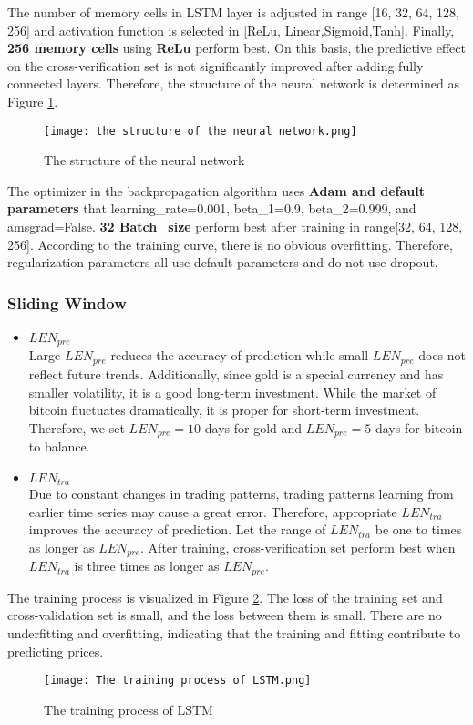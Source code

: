 \documentclass[12pt]{article}
\begin{document}
The number of memory cells in LSTM layer is adjusted in range [16, 32, 64, 128, 256] and activation function is selected in [ReLu, Linear,Sigmoid,Tanh]. Finally, \textbf{256 memory cells} using \textbf{ReLu} perform best. On this basis, the predictive effect on the cross-verification set is not significantly improved after adding fully connected layers. Therefore, the structure of the neural network is determined as Figure \ref{F5}.
\begin{figure}[htb]
\centering
\texttt{[image: the structure of the neural network.png]}
\caption{The structure of the neural network}
\label{F5} %
\end{figure}
The optimizer in the backpropagation algorithm uses \textbf{Adam and default parameters} that learning\_rate=0.001, beta\_1=0.9, beta\_2=0.999, and amsgrad=False. \textbf{32 Batch\_size} perform best after training in range[32, 64, 128, 256]. According to the training curve, there is no obvious overfitting. Therefore, regularization parameters all use default parameters and do not use dropout.

\subsubsection{Sliding Window}
\begin{itemize}
\item \textbf{$LEN_{pre}$}\\
Large $LEN_{pre}$ reduces the accuracy of prediction while small $LEN_{pre}$ does not reflect future trends. Additionally, since gold is a special currency and has smaller volatility, it is a good long-term investment. While the market of bitcoin fluctuates dramatically, it is proper for short-term investment. Therefore, we set $LEN_{pre}=10$ days for gold and $LEN_{pre}=5$ days for bitcoin to balance. 
\item \textbf{$LEN_{tra}$}\\
Due to constant changes in trading patterns, trading patterns learning from earlier time series may cause a great error. Therefore, appropriate $LEN_{tra}$ improves the accuracy of prediction. Let the range of $LEN_{tra}$ be one to times as longer as $LEN_{pre}$. After training, cross-verification set perform best when $LEN_{tra}$ is three times as longer as $LEN_{pre}$.
\end{itemize}

The training process is visualized in Figure \ref{F6}. The loss of the training set and cross-validation set is small, and the loss between them is small. There are no underfitting and overfitting, indicating that the training and fitting contribute to predicting prices.
\begin{figure}[htb]
\centering
\texttt{[image: The training process of LSTM.png]}
\caption{The training process of LSTM}
\label{F6} %
\end{figure}
\end{document}
